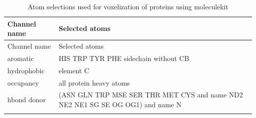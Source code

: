 \documentclass[ lineno,
  9pt]{elife}
\newenvironment{tablenos:tagged-table}[1][]{
  \let\oldthetable\thetable
  \let\oldtheHtable\theHtable
  \renewcommand{\thetable}{#1}
  \renewcommand{\theHtable}{#1}
}{
  \let\thetable\oldthetable
  \let\theHtable\oldtheHtable
  \addtocounter{table}{-1}
}
\begin{document}
\begin{tablenos:tagged-table}[S2]

\begin{longtable}[]{@{}ll@{}}
\caption{Atom selections used for voxelization of proteins using moleculekit \label{tbl:voxelchannels}}\tabularnewline
\toprule
\begin{minipage}[b]{0.14\columnwidth}\raggedright
Channel name\strut
\end{minipage} & \begin{minipage}[b]{0.81\columnwidth}\raggedright
Selected atoms\strut
\end{minipage}\tabularnewline
\midrule
\endfirsthead
\toprule
\begin{minipage}[b]{0.14\columnwidth}\raggedright
Channel name\strut
\end{minipage} & \begin{minipage}[b]{0.81\columnwidth}\raggedright
Selected atoms\strut
\end{minipage}\tabularnewline
\midrule
\endhead
\begin{minipage}[t]{0.14\columnwidth}\raggedright
aromatic\strut
\end{minipage} & \begin{minipage}[t]{0.81\columnwidth}\raggedright
HIS TRP TYR PHE sidechain without CB\strut
\end{minipage}\tabularnewline
\begin{minipage}[t]{0.14\columnwidth}\raggedright
hydrophobic\strut
\end{minipage} & \begin{minipage}[t]{0.81\columnwidth}\raggedright
element C\strut
\end{minipage}\tabularnewline
\begin{minipage}[t]{0.14\columnwidth}\raggedright
occupancy\strut
\end{minipage} & \begin{minipage}[t]{0.81\columnwidth}\raggedright
all protein heavy atoms\strut
\end{minipage}\tabularnewline
\begin{minipage}[t]{0.14\columnwidth}\raggedright
hbond donor\strut
\end{minipage} & \begin{minipage}[t]{0.81\columnwidth}\raggedright
(ASN GLN TRP MSE SER THR MET CYS and name ND2 NE2 NE1 SG SE OG OG1) and name N\strut
\end{minipage}\tabularnewline
\begin{minipage}[t]{0.14\columnwidth}\raggedright

\end{minipage}
\end{longtable}
\end{tablenos:tagged-table}
\end{document}
